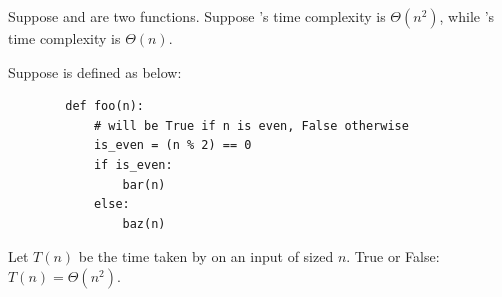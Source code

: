 \begin{prob}
    Suppose  and  are two functions.
    Suppose 's time complexity is $\Theta(n^2)$, while 's
    time complexity is $\Theta(n)$.

    Suppose  is defined as below:

    \begin{verbatim}
        def foo(n):
            # will be True if n is even, False otherwise
            is_even = (n % 2) == 0
            if is_even:
                bar(n)
            else:
                baz(n)
    \end{verbatim}

    Let $T(n)$ be the time taken by  on an input of sized $n$.
    True or False: $T(n) = \Theta(n^2)$.

    \tF{}
\end{prob}
